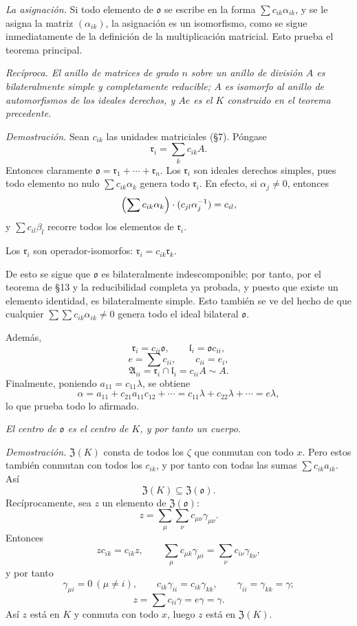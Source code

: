 \documentclass[11pt]{article}
\providecommand{\mA}{\mathfrak{A}}
\providecommand{\mo}{\mathfrak{o}}
\providecommand{\ml}{\mathfrak{l}}
\providecommand{\mr}{\mathfrak{r}}
\providecommand{\mZ}{\mathfrak{Z}}
\begin{document}
\emph{La asignación.} Si todo elemento de $\mo$ se escribe en la forma $\sum c_{ik}\alpha_{ik}$, y se le asigna la matriz $(\alpha_{ik})$, la asignación es un isomorfismo, como se sigue inmediatamente de la definición de la multiplicación matricial. Esto prueba el teorema principal.

\emph{Recíproca. El anillo de matrices de grado $n$ sobre un anillo de división $A$ es bilateralmente simple y completamente reducible; $A$ es isomorfo al anillo de automorfismos de los ideales derechos, y $Ae$ es el $K$ construido en el teorema precedente.}

\emph{Demostración.} Sean $c_{ik}$ las unidades matriciales (§7). Póngase
\[
        \mr_i=\sum_k c_{ik}A.
\]
Entonces claramente $\mo=\mr_1+\cdots+\mr_n$. Los $\mr_i$ son ideales derechos simples, pues todo elemento no nulo $\sum c_{ik}\alpha_k$ genera todo $\mr_i$. En efecto, si $\alpha_j\ne0$, entonces
\[
        \Bigl(\sum c_{ik}\alpha_k\Bigr)\cdot(c_{jl}\alpha_j^{-1})=c_{il},
\]
y $\sum c_{il}\beta_l$ recorre todos los elementos de $\mr_i$.

Los $\mr_i$ son operador-isomorfos: $\mr_i=c_{ik}\mr_k$.

De esto se sigue que $\mo$ es bilateralmente indescomponible; por tanto, por el teorema de §13 y la reducibilidad completa ya probada, y puesto que existe un elemento identidad, es bilateralmente simple. Esto también se ve del hecho de que cualquier $\sum\sum c_{ik}\alpha_{ik}\ne0$ genera todo el ideal bilateral $\mo$.

Además,
\[
        \mr_i=c_{ii}\mo,
        \qquad
        \ml_i=\mo c_{ii},
\]
\[
        e=\sum c_{ii},
        \qquad c_{ii}=e_i,
\]
\[
        \mA_{ii}=\mr_i\cap\ml_i=c_{ii}A\sim A.
\]
Finalmente, poniendo $a_{11}=c_{11}\lambda$, se obtiene
\[
        \alpha=a_{11}+c_{21}a_{11}c_{12}+\cdots
        =c_{11}\lambda+c_{22}\lambda+\cdots=e\lambda,
\]
lo que prueba todo lo afirmado.

\emph{El centro de $\mo$ es el centro de $K$, y por tanto un cuerpo.}

\emph{Demostración.} $\mZ(K)$ consta de todos los $\zeta$ que conmutan con todo $x$. Pero estos también conmutan con todos los $c_{ik}$, y por tanto con todas las sumas $\sum c_{ik}a_{ik}$. Así
\[
        \mZ(K)\subseteq\mZ(\mo).
\]
Recíprocamente, sea $z$ un elemento de $\mZ(\mo)$:
\[
        z=\sum_\mu\sum_\nu c_{\mu\nu}\gamma_{\mu\nu}.
\]
Entonces
\[
        zc_{ik}=c_{ik}z,
        \qquad
        \sum_\mu c_{\mu k}\gamma_{\mu i}=\sum_\nu c_{i\nu}\gamma_{k\nu},
\]
y por tanto
\[
        \gamma_{\mu i}=0\ (\mu\ne i),
        \qquad
        c_{ik}\gamma_{ii}=c_{ik}\gamma_{kk},
        \qquad
        \gamma_{ii}=\gamma_{kk}=\gamma;
\]
\[
        z=\sum c_{ii}\gamma=e\gamma=\gamma.
\]
Así $z$ está en $K$ y conmuta con todo $x$, luego $z$ está en $\mZ(K)$.
\end{document}
